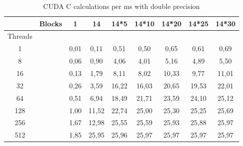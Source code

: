 \begin{table}[h!]
\centering
\begin{tabular}{ | c | c | c | c | c | c | c | c | c | }
  \hline
           & Blocks &  1   &   14  & 14*5  & 14*10 & 14*20 & 14*25 & 14*30 \\ \hline
  Threads  &        &      &       &       &       &       &       &       \\ \hline
  1        &        & 0,01 & 0,11  & 0,51  & 0,50  & 0,65  & 0,61  & 0,69  \\ \hline
  8        &        & 0,06 & 0,90  & 4,06  & 4,01  & 5,16  & 4,89  & 5,50  \\ \hline
  16       &        & 0,13 & 1,79  & 8,11  & 8,02  & 10,33 & 9,77  & 11,01  \\ \hline
  32       &        & 0,26 & 3,59  & 16,22 & 16,03 & 20,65 & 19,53 & 22,01 \\ \hline
  64       &        & 0,51 & 6,94  & 18,49 & 21,71 & 23,59 & 24,10 & 25,12 \\ \hline
  128      &        & 1,00 & 11,52 & 22,74 & 25,00 & 25,30 & 25,25 & 25,69 \\ \hline
  256      &        & 1,67 & 12,98 & 25,55 & 25,59 & 25,93 & 25,88 & 25,97 \\ \hline
  512      &        & 1,85 & 25,95 & 25,96 & 25,97 & 25,97 & 25,97 & 25,97 \\ \hline
\end{tabular}
\caption{CUDA C calculations per ms with double precision\label{table:cudacdoubletime}}
\end{table}